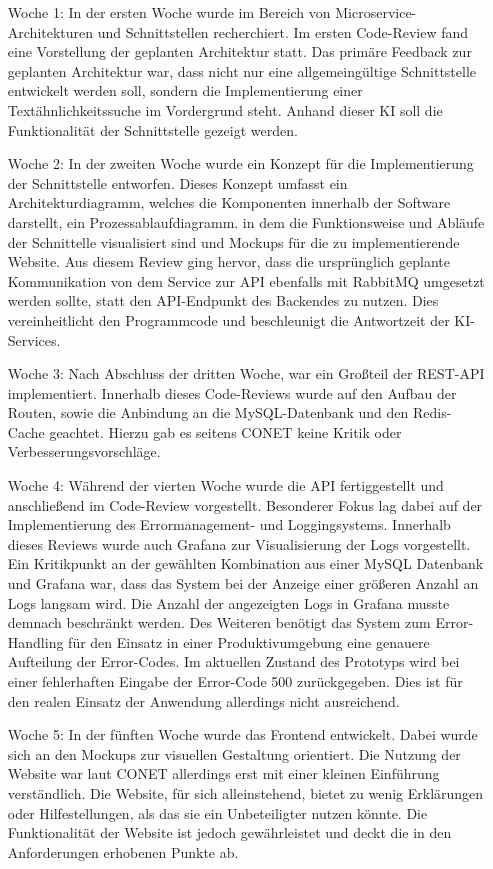 \begin{itemize}[leftmargin=6em]
\item [Woche 1:] In der ersten Woche wurde im Bereich von Microservice-Architekturen und Schnittstellen recherchiert. Im ersten Code-Review fand eine Vorstellung der geplanten Architektur statt. Das primäre Feedback zur geplanten Architektur war, dass nicht nur eine allgemeingültige Schnittstelle entwickelt werden soll, sondern die Implementierung einer Textähnlichkeitssuche im Vordergrund steht. Anhand dieser KI soll die Funktionalität der Schnittstelle gezeigt werden.
\item [Woche 2:] In der zweiten Woche wurde ein Konzept für die Implementierung der Schnittstelle entworfen. Dieses Konzept umfasst ein Architekturdiagramm, welches die Komponenten innerhalb der Software darstellt, ein Prozessablaufdiagramm. in dem die Funktionsweise und Abläufe der Schnittelle visualisiert sind und Mockups für die zu implementierende Website. Aus diesem Review ging hervor, dass die ursprünglich geplante Kommunikation von dem Service zur API ebenfalls mit RabbitMQ umgesetzt werden sollte, statt den API-Endpunkt des Backendes zu nutzen. Dies vereinheitlicht den Programmcode und beschleunigt die Antwortzeit der KI-Services.
\item [Woche 3:] Nach Abschluss der dritten Woche, war ein Großteil der REST-API implementiert. Innerhalb dieses Code-Reviews wurde auf den Aufbau der Routen, sowie die Anbindung an die MySQL-Datenbank und den Redis-Cache geachtet. Hierzu gab es seitens CONET keine Kritik oder Verbesserungsvorschläge.
\item [Woche 4:] Während der vierten Woche wurde die API fertiggestellt und anschließend im Code-Review vorgestellt. Besonderer Fokus lag dabei auf der Implementierung des Errormanagement- und Loggingsystems. Innerhalb dieses Reviews wurde auch Grafana zur Visualisierung der Logs vorgestellt. Ein Kritikpunkt an der gewählten Kombination aus einer MySQL Datenbank und Grafana war, dass das System bei der Anzeige einer größeren Anzahl an Logs langsam wird. Die Anzahl der angezeigten Logs in Grafana musste demnach beschränkt werden. Des Weiteren benötigt das System zum Error-Handling für den Einsatz in einer Produktivumgebung eine genauere Aufteilung der Error-Codes. Im aktuellen Zustand des Prototyps wird bei einer fehlerhaften Eingabe der Error-Code 500 zurückgegeben. Dies ist für den realen Einsatz der Anwendung allerdings nicht ausreichend.
\item [Woche 5:] In der fünften Woche wurde das Frontend entwickelt. Dabei wurde sich an den Mockups zur visuellen Gestaltung orientiert. Die Nutzung der Website war laut CONET allerdings erst mit einer kleinen Einführung verständlich. Die Website, für sich alleinstehend, bietet zu wenig Erklärungen oder Hilfestellungen, als das sie ein Unbeteiligter nutzen könnte. Die Funktionalität der Website ist jedoch gewährleistet und deckt die in den Anforderungen erhobenen Punkte ab.

\end{itemize}
